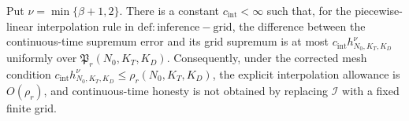 Put \(\nu=\min\{\beta+1,2\}\).  There is a constant \(c_{\mathrm{int}}<\infty\) such that, for the piecewise-linear interpolation rule in \(\mathrm{def:inference-grid}\), the difference between the continuous-time supremum error and its grid supremum is at most \(c_{\mathrm{int}}h_{N_0,K_T,K_D}^{\nu}\) uniformly over \(\mathfrak P_r(N_0,K_T,K_D)\).  Consequently, under the corrected mesh condition \(c_{\mathrm{int}}h_{N_0,K_T,K_D}^{\nu}\le\rho_r(N_0,K_T,K_D)\), the explicit interpolation allowance is \(O(\rho_r)\), and continuous-time honesty is not obtained by replacing \(\mathcal I\) with a fixed finite grid.